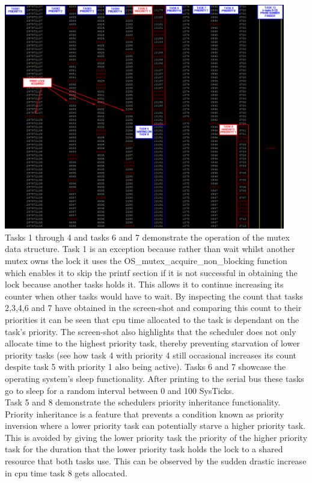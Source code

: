\documentclass[12pt,a4paper]{article}
\begin{document}
\includegraphics[width=0.92\textwidth]{images/priorityInheritance.png}\\

Tasks 1 through 4 and tasks 6 and 7 demonstrate the operation of the mutex data structure. Task 1 is an exception because rather than wait whilst another mutex owns the lock it uses the OS\_mutex\_acquire\_non\_blocking function which enables it to skip the printf section if it is not successful in obtaining the lock because another tasks holds it. This allows it to continue increasing its counter when other tasks would have to wait. By inspecting the count that tasks 2,3,4,6 and 7 have obtained in the screen-shot and comparing this count to their priorities it can be seen that cpu time allocated to the task is dependant on the task's priority. The screen-shot also highlights that the scheduler does not only allocate time to the highest priority task, thereby preventing starvation of lower priority tasks (see how task 4 with priority 4 still occasional increases its count despite task 5 with priority 1 also being active). Tasks 6 and 7 showcase the operating system's sleep functionality. After printing to the serial bus these tasks go to sleep for a random interval between 0 and 100 SysTicks.\\

Task 5 and 8 demonstrate the schedulers priority inheritance functionality. Priority inheritance is a feature that prevents a condition known as priority inversion where a lower priority task can potentially starve a higher priority task. This is avoided by giving the lower priority task the priority of the higher priority task for the duration that the lower priority task holds the lock to a shared resource that both tasks use. This can be observed by the sudden drastic increase in cpu time task 8 gets allocated. \\
\end{document}

